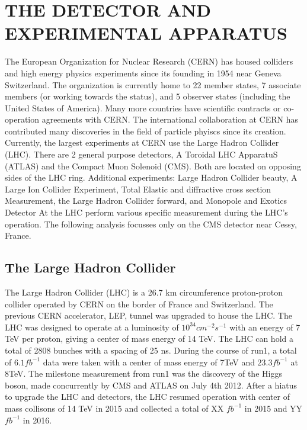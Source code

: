 %
%

\chapter{THE DETECTOR AND EXPERIMENTAL APPARATUS}
The European Organization for Nuclear Research (CERN) has housed
colliders and high energy physics experiments since its founding in
1954 near Geneva Switzerland.  The organization is currently home to
22 member states, 7 associate members (or working towards the status),
and 5 observer states (including the United States of America).  Many
more countries have scientific contracts or co-operation agreements
with CERN.  The international collaboration at CERN
has contributed many discoveries in the field of particle phyiscs
since its creation.  Currently, the largest experiments at CERN use
the Large Hadron Collider (LHC).  There are 2 general purpose
detectors, A Toroidal LHC ApparatuS (ATLAS) and the Compact Muon
Solenoid (CMS).  Both are located on opposing sides of the LHC ring.
Additional experiments: Large Hadron Collider beauty, A Large Ion
Collider Experiment, Total Elastic and diffractive cross section
Measurement, the Large Hadron Collider forward, and Monopole and
Exotics Detector At the LHC perform various specific measurement
during the LHC's operation.  The following analysis focusses only on
the CMS detector near Cessy, France.

\section{The Large Hadron Collider}
\label{sec:LHC}
The Large Hadron Collider (LHC) is a 26.7 km circumference
proton-proton collider operated by CERN on the border of France and
Switzerland.  The previous CERN accelerator, LEP, tunnel was upgraded
to house the LHC.  The LHC was designed to operate at a luminosity of
$10^{34} cm^{-2}s^{-1}$ with an energy of 7 TeV per proton, giving a
center of mass energy of 14 TeV. The LHC can hold a total of 2808
bunches with a spacing of 25 ns.  During the course of run1, a total
of $6.1fb^{-1}$ data were taken with a center of mass energy of 7TeV and
$23.3 fb^{-1}$ at 8TeV.  The milestone measurement from run1 was the
discovery of the Higgs boson, made concurrently by CMS and ATLAS on
July 4th 2012.  After a hiatus to upgrade the LHC and detectors, the
LHC resumed operation with center of mass collisons of 14 TeV in 2015
and collected a total of XX $fb^{-1}$ in 2015 and YY $fb^{-1}$ in 2016.

